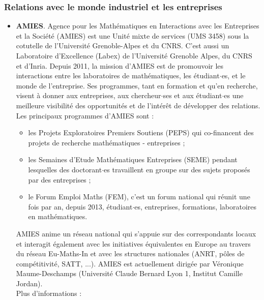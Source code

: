 \subsubsection{Relations avec le monde industriel et les entreprises}

\begin{itemize}
\item {\bf AMIES}.
Agence pour les Math\'ematiques en Interactions avec les Entreprises et la Soci\'et\'e (AMIES) est une Unit\'e mixte de services (UMS 3458) sous la cotutelle de l'Universit\'e Grenoble-Alpes et du CNRS. C'est aussi un Laboratoire d'Excellence (Labex) de l'Universit\'e Grenoble Alpes, du CNRS et d'Inria. Depuis 2011, la mission d'AMIES est de promouvoir les interactions entre les laboratoires de 	math\'ematiques, les \'etudiant$\cdot$es, et le monde de l'entreprise. Ses programmes, tant en formation et qu'en recherche, visent \`a donner aux entreprises, aux chercheur$\cdot$ses et aux \'etudiant$\cdot$es une meilleure 	visibilit\'e des opportunit\'es et de l'int\'er\^et de d\'evelopper des relations. Les principaux programmes d'AMIES sont :
	\begin{itemize}
	\item les Projets Exploratoires Premiers Soutiens (PEPS) qui co-financent des projets de recherche math\'ematiques - entreprises ;
	\item les Semaines d'Etude Math\'ematiques Entreprises (SEME) pendant lesquelles des doctorant$\cdot$es travaillent en groupe sur des sujets propos\'es par des entreprises ;
	\item le Forum Emploi Maths (FEM), c'est un forum national qui r\'eunit une fois par an, depuis 2013, \'etudiant$\cdot$es, entreprises, formations, laboratoires en math\'ematiques. 
	\end{itemize}
AMIES anime un r\'eseau national qui s'appuie sur des correspondants locaux et interagit \'egalement avec les initiatives \'equivalentes en Europe au travers du r\'eseau Eu-Maths-In et avec les structures	nationales (ANRT, p\^oles de comp\'etitivit\'e, SATT, ...). AMIES est actuellement dirig\'ee par V\'eronique Maume-Deschamps (Universit\'e Claude Bernard Lyon 1, Institut Camille Jordan).
\\Plus d'informations :  
\end{itemize}

